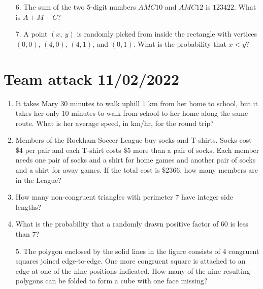 \documentclass[12pt]{article}
\begin{document}
  \begin{enumerate}[leftmargin=3mm]
    \item[6.] The sum of the two 5-digit numbers $AMC10$ and $AMC12$ is $123422$. What is $A+M+C$?
    \item[7.] A point $(x,\ y)$ is randomly picked from inside the rectangle with vertices $(0,0)$, $(4,0)$, $(4,1)$, and $(0,1)$. What is the probability that $x<y$?
  \end{enumerate}

  \newpage
  \section*{Team attack 11/02/2022}
  \begin{enumerate}[leftmargin=3mm]
    \item It takes Mary $30$ minutes to walk uphill $1$ km from her home to school, but it takes her only $10$ minutes to walk from school to her home along the same route. What is her average speed, in km/hr, for the round trip?
    \item Members of the Rockham Soccer League buy socks and T-shirts. Socks cost \$4 per pair and each T-shirt costs \$5 more than a pair of socks. Each member needs one pair of socks and a shirt for home games and another pair of socks and a shirt for away games. If the total cost is \$2366, how many members are in the League?
    \item How many non-congruent triangles with perimeter $7$ have integer side lengths?
    \item What is the probability that a randomly drawn positive factor of $60$ is less than $7$?
  \end{enumerate}
  \begin{minipage}{0.25\textwidth}
    \begin{enumerate}[leftmargin=3mm]
      \item[5.] The polygon enclosed by the solid lines in the figure consists of 4 congruent squares joined edge-to-edge. One more congruent square is attached to an edge at one of the nine positions indicated. How many of the nine resulting polygons can be folded to form a cube with one face missing?
    \end{enumerate}
  \end{minipage}\qquad
\end{document}
